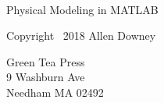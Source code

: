 \documentclass[
]{book}
\numberwithin{Answer}{chapter}
\numberwithin{Exercise}{chapter}
\newcommand{\myreg}{\textsuperscript{{\tiny \textregistered}}}
\newcommand{\thetitle}{Physical Modeling in MATLAB\myreg}
\renewcommand{\chaptermark}[1]{\markboth{#1}{}}
\renewcommand{\sectionmark}[1]{\markright{\thesection\ #1}{}}
\renewcommand\MakeUppercase{}
\begin{document}
\renewcommand{\l@section}{\@dottedtocline{1}{1.5em}{3.0em}}
\setcounter{tocdepth}{1}

\makeatother     %


\newcommand{\clearemptydoublepage}{\cleardoublepage}

\newcommand{\blankpage}{\vspace*{1in}\newpage}

\renewcommand{\chaptermark}[1]{\markboth{#1}{}}
\renewcommand{\sectionmark}[1]{\markright{\thesection\ #1}{}}

\lhead[\fancyplain{}{\bfseries\thepage}]%
      {\fancyplain{}{\bfseries\rightmark}}
\rhead[\fancyplain{}{\bfseries\leftmark}]%
      {\fancyplain{}{\bfseries\thepage}}
\cfoot{}

\pagestyle{fancyplain}


\renewcommand\MakeUppercase{}




\maketitle


\vspace{2in}

\begin{center}
    {\Large \thetitle}
\end{center}

\vspace{21em}

Copyright \textcopyright \, 2018 Allen Downey

\vspace{0.5em}

\begin{flushleft}
Green Tea Press       \\
9 Washburn Ave \\
Needham MA 02492
\end{flushleft}
\end{document}
